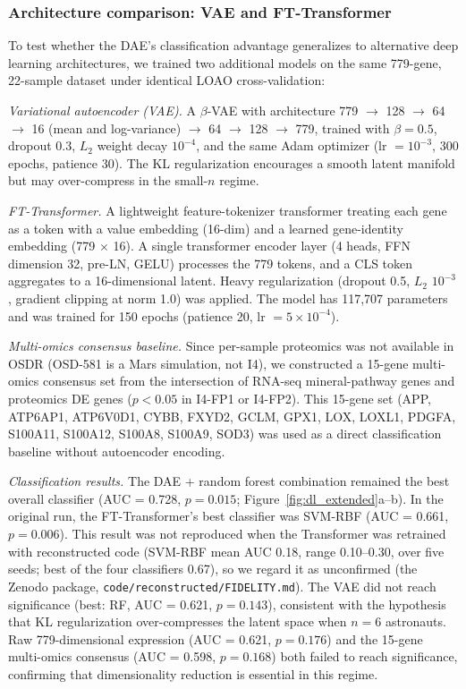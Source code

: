 \documentclass[11pt,a4paper]{article}
\begin{document}
\subsubsection{Architecture comparison: VAE and FT-Transformer}

To test whether the DAE's classification advantage generalizes to alternative deep learning architectures, we trained two additional models on the same 779-gene, 22-sample dataset under identical LOAO cross-validation:

\textit{Variational autoencoder (VAE).} A $\beta$-VAE with architecture 779 $\to$ 128 $\to$ 64 $\to$ 16 (mean and log-variance) $\to$ 64 $\to$ 128 $\to$ 779, trained with $\beta = 0.5$, dropout 0.3, $L_2$ weight decay $10^{-4}$, and the same Adam optimizer (lr $= 10^{-3}$, 300 epochs, patience 30). The KL regularization encourages a smooth latent manifold but may over-compress in the small-$n$ regime.

\textit{FT-Transformer.} A lightweight feature-tokenizer transformer treating each gene as a token with a value embedding (16-dim) and a learned gene-identity embedding (779 $\times$ 16). A single transformer encoder layer (4 heads, FFN dimension 32, pre-LN, GELU) processes the 779 tokens, and a CLS token aggregates to a 16-dimensional latent. Heavy regularization (dropout 0.5, $L_2$ $10^{-3}$, gradient clipping at norm 1.0) was applied. The model has 117,707 parameters and was trained for 150 epochs (patience 20, lr $= 5 \times 10^{-4}$).

\textit{Multi-omics consensus baseline.} Since per-sample proteomics was not available in OSDR (OSD-581 is a Mars simulation, not I4), we constructed a 15-gene multi-omics consensus set from the intersection of RNA-seq mineral-pathway genes and proteomics DE genes ($p < 0.05$ in I4-FP1 or I4-FP2). This 15-gene set (APP, ATP6AP1, ATP6V0D1, CYBB, FXYD2, GCLM, GPX1, LOX, LOXL1, PDGFA, S100A11, S100A12, S100A8, S100A9, SOD3) was used as a direct classification baseline without autoencoder encoding.

\textit{Classification results.} The DAE + random forest combination remained the best overall classifier (AUC = 0.728, $p = 0.015$; Figure~\ref{fig:dl_extended}a--b). In the original run, the FT-Transformer's best classifier was SVM-RBF (AUC = 0.661, $p = 0.006$). This result was not reproduced when the Transformer was retrained with reconstructed code (SVM-RBF mean AUC 0.18, range 0.10--0.30, over five seeds; best of the four classifiers 0.67), so we regard it as unconfirmed (the Zenodo package, \texttt{code/reconstructed/FIDELITY.md}). The VAE did not reach significance (best: RF, AUC = 0.621, $p = 0.143$), consistent with the hypothesis that KL regularization over-compresses the latent space when $n = 6$ astronauts. Raw 779-dimensional expression (AUC = 0.621, $p = 0.176$) and the 15-gene multi-omics consensus (AUC = 0.598, $p = 0.168$) both failed to reach significance, confirming that dimensionality reduction is essential in this regime.
\end{document}
